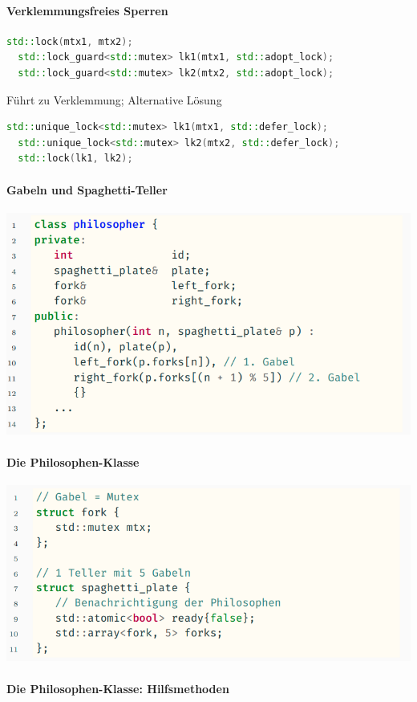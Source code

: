 \documentclass[10pt]{article}
\begin{document}
\paragraph{Verklemmungsfreies Sperren}

\begin{lstlisting}[language=C++]
  std::lock(mtx1, mtx2);
  std::lock_guard<std::mutex> lk1(mtx1, std::adopt_lock);
  std::lock_guard<std::mutex> lk2(mtx2, std::adopt_lock);
  \end{lstlisting}
Führt zu Verklemmung; Alternative Lösung
\begin{lstlisting}[language=C++]
  std::unique_lock<std::mutex> lk1(mtx1, std::defer_lock);
  std::unique_lock<std::mutex> lk2(mtx2, std::defer_lock);
  std::lock(lk1, lk2);
  \end{lstlisting}

\paragraph{Gabeln und Spaghetti-Teller}

\begin{center}
  \includegraphics[width=0.4\linewidth]{Assets/Programmierparadigmen-code-snippet-25}
\end{center}

\paragraph{Die Philosophen-Klasse}

\begin{center}
  \includegraphics[width=0.4\linewidth]{Assets/Programmierparadigmen-code-snippet-26}
\end{center}

\paragraph{Die Philosophen-Klasse: Hilfsmethoden}
\end{document}
